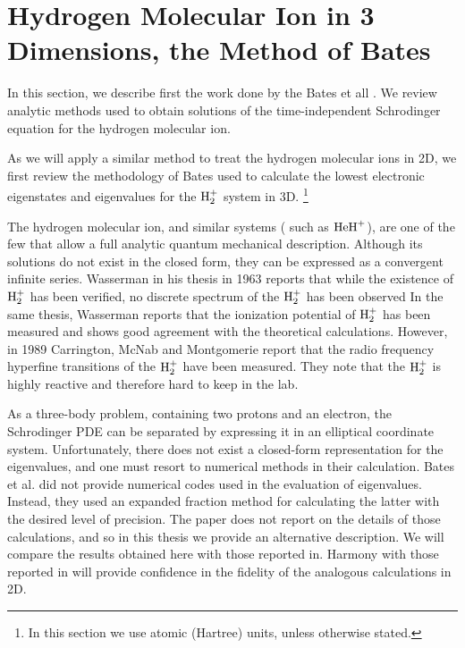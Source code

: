 \section{Hydrogen Molecular Ion in 3 Dimensions,  the Method of Bates}

In this section, we describe first the work done by the Bates et all \cite{Bates1}\cite{Bates2}\cite{Slater}.  We review analytic methods\cite{Bates1}\cite{Bates2}\cite{Slater} used to obtain solutions of the time-independent Schrodinger equation for the hydrogen molecular ion.

As we will apply a similar method to treat the hydrogen molecular ions in 2D,
we first review the methodology of Bates \cite{Bates1}\cite{Bates2} used to calculate the lowest electronic eigenstates and eigenvalues for the $ {\rm H}_2^{+} $ system in 3D. \footnote {In this section we use atomic (Hartree) units, unless otherwise stated.}

The hydrogen molecular ion, and similar systems ( such as $ {\rm HeH}^{+} $), are one of the few that allow a full analytic quantum mechanical description. Although its
solutions do not exist in the closed form, they can be expressed as a convergent infinite series.  Wasserman in his thesis \cite{ExperimentalBates2} in 1963 reports that while the existence of $ {\rm H}_2^{+} $ has been verified, no  discrete spectrum of the  $ {\rm H}_2^{+} $ has been observed  In the same thesis, Wasserman reports that the ionization potential of $ {\rm H}_2^{+} $ has been measured and shows good agreement with the theoretical calculations. However, in 1989 Carrington, McNab and Montgomerie report \cite{ExperimentalBates3} that the radio frequency hyperfine transitions of the $ {\rm H}_2^{+} $ have been measured. They note that the $ {\rm H}_2^{+} $  is highly reactive and therefore hard to keep in the lab.

As a three-body problem, containing two protons and an electron,
the Schrodinger PDE can be separated by expressing it in an elliptical coordinate system. Unfortunately, there does not exist a closed-form representation for the eigenvalues, and one must resort to numerical methods in their calculation.
Bates et al. \cite{Bates1}\cite{Bates2} did not provide numerical codes used in the evaluation of eigenvalues. Instead, they used an expanded fraction method for calculating the latter with the desired level of precision. The paper\cite{Bates2} does not report on the details of those calculations, and so in this thesis we provide an alternative description. We will compare
 the results obtained here with those reported in\cite{Bates2}. Harmony with those reported in\cite{Bates2} will provide 
 confidence in the fidelity of the analogous calculations in 2D.

